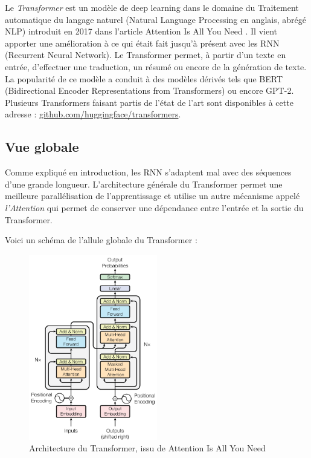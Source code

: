 Le \textit{Transformer} est un modèle de deep learning dans le domaine du Traitement automatique du langage naturel (Natural Language Processing en anglais, abrégé NLP)
introduit en 2017 dans l'article \og Attention Is All You Need \fg{}\cite{vaswani2017attention}.
Il vient apporter une amélioration à ce qui était fait jusqu'à présent avec les RNN (Recurrent Neural Network).
Le Transformer permet, à partir d'un texte en entrée, d'effectuer une traduction, un résumé ou encore de la génération de texte. \\

La popularité de ce modèle a conduit à des modèles dérivés tels que
BERT (Bidirectional Encoder Representations from Transformers)\cite{devlin2018bert} ou encore GPT-2\cite{radford2019gpt2}.
Plusieurs Transformers faisant partis de l'état de l'art sont disponibles à cette adresse : \href{https://github.com/huggingface/transformers}{github.com/huggingface/transformers}.

\subsection{Vue globale}

Comme expliqué en introduction, les RNN s'adaptent mal avec des séquences d'une grande longueur.
L'architecture générale du Transformer permet une meilleure parallélisation de l'apprentissage et utilise un autre mécanisme appelé \textit{l'Attention} qui permet
de conserver une dépendance entre l'entrée et la sortie du Transformer.

Voici un schéma de l'allule globale du Transformer :
\begin{figure}[h]
  \begin{center}
  \includegraphics[width=0.5\textwidth]{img/architecture_transformer.png}
  \end{center}
  \caption{Architecture du Transformer, issu de \og Attention Is All You Need \fg{}\cite{vaswani2017attention}}
  \label{fig:transformer}
\end{figure}

